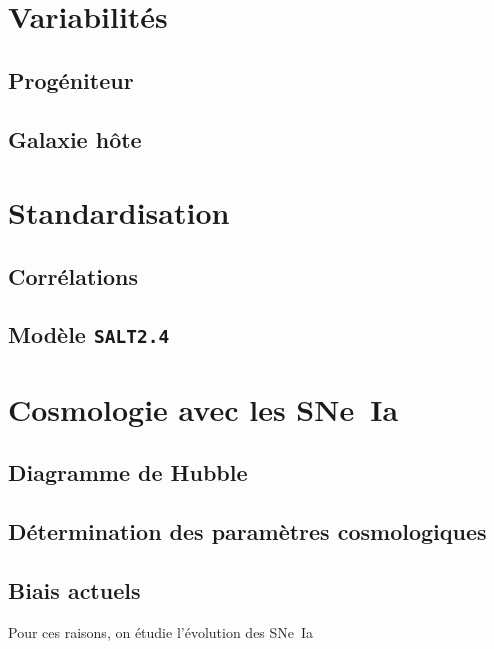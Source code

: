 \documentclass[../main/main.tex]{subfiles}
\begin{document}
\section{Variabilités}\label{sec:varia}

\subsection{Progéniteur}\label{ssec:prog}

\subsection{Galaxie hôte}\label{ssec:host}


\section{Standardisation}\label{sec:stand}

\subsection{Corrélations}\label{ssec:corr}

\subsection{Modèle \texttt{SALT2.4}}\label{ssec:salt}


\section{Cosmologie avec les SNe~Ia}\label{sec:snecosmo}

\subsection{Diagramme de Hubble}\label{ssec:hubble}

\subsection{Détermination des paramètres cosmologiques}\label{ssec:pcosmo}

\subsection{Biais actuels}\label{ssec:biais}

Pour ces raisons, on étudie l'évolution des SNe~Ia
\end{document}
